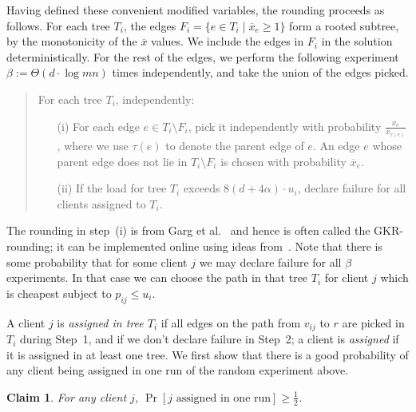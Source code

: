 \documentclass[letterpaper,11pt]{article}
\newtheorem{claim}[thm]{Claim}
\newcommand{\ox}{\ensuremath{\overline{x}}\xspace}
\def\ox{\overline{x}}
\begin{document}
Having defined these convenient modified variables, the rounding
proceeds as follows. For each tree $T_i$, the edges $F_i = \{e\in T_i
\mid \ox_e\ge 1\}$ form a rooted subtree, by the monotonicity of the
$\ox$ values. We include the edges in $F_i$ in the solution
deterministically. For the rest of the edges, we perform the following
experiment $\beta := \Theta(d\cdot \log mn)$ times independently, and
take the union of the edges picked.
\begin{quote}
  For each tree $T_i$, independently:
  \begin{enumerate}
  \item[(i)] For each edge $e\in T_i \setminus F_i$, pick it independently
    with probability $\frac{\ox_e}{\ox_{\tau(e)}}$, where we use
    $\tau(e)$ to denote the parent edge of $e$. An edge $e$ whose parent
    edge does not lie in $T_i\setminus F_i$ is chosen with probability
    $\ox_e$.
  \item[(ii)] If the load for tree $T_i$ exceeds $8(d+4\alpha)\cdot u_i$,
    declare failure for all clients assigned to $T_i$.
  \end{enumerate}
\end{quote}
The rounding in step~(i) is from Garg et al.~\cite{GKR98} and hence is
often called the GKR-rounding; it can be implemented online using ideas
from~\cite{AAABN-talg06}. Note that there is some probability that for
some client $j$ we may declare failure for all $\beta$ experiments. In
that case we can choose the path in that tree $T_i$ for client $j$ which
is cheapest subject to $p_{ij} \leq u_i$.

A client $j$ is \emph{assigned in tree $T_i$} if all edges on the path
from $v_{ij}$ to $r$ are picked in $T_i$ during Step~1, and if we don't
declare failure in Step~2; a client is \emph{assigned} if it is assigned
in at least one tree.  We first show that there is a good probability of
any client being assigned in one run of the random experiment above.
\begin{claim}
  \label{cl:cmp-alteration}
  For any client $j$, $\Pr[j\mbox{ assigned in one run}] \ge \frac12$.
\end{claim}
\end{document}
